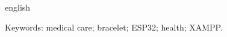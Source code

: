 \begin{resumo}[Abstract]
\begin{otherlanguage*}{english}
\begin{SingleSpace}
\vspace{\onelineskip}
\noindent Keywords: medical care; bracelet; ESP32; health; XAMPP.

\end{SingleSpace}
\end{otherlanguage*}
\end{resumo}